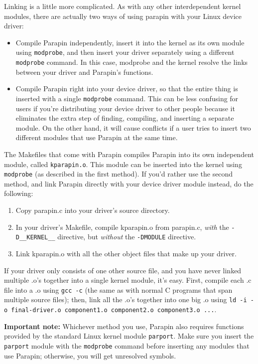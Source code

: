 \documentclass{article}
\begin{document}
Linking is a little more complicated.  As with any other
interdependent kernel modules, there are actually two ways of using
parapin with your Linux device driver:
\begin{itemize}
\item Compile Parapin independently, insert it into the kernel as its
own module using {\tt modprobe}, and then insert your driver separately
using a different {\tt modprobe} command.  In this case, modprobe and the
kernel resolve the links between your driver and Parapin's functions.
\item Compile Parapin right into your device driver, so that the
entire thing is inserted with a single {\tt modprobe} command.  This can
be less confusing for users if you're distributing your device driver
to other people because it eliminates the extra step of finding,
compiling, and inserting a separate module.  On the other hand, it
will cause conflicts if a user tries to insert two different modules
that use Parapin at the same time.
\end{itemize}

The Makefiles that come with Parapin compiles Parapin into its own
independent module, called {\tt kparapin.o}.  This module can be
inserted into the kernel using {\tt modprobe} (as described in the first
method).  If you'd rather use the second method, and link Parapin
directly with your device driver module instead, do the following:

\begin{enumerate}
\item Copy parapin.c into your driver's source directory.
\item In your driver's Makefile, compile kparapin.o from parapin.c,
{\em with} the \verb|-D__KERNEL__| directive, but {\em without} the
{\tt -DMODULE} directive.
\item Link kparapin.o with all the other object files that make up
your driver.
\end{enumerate}

If your driver only consists of one other source file, and you have
never linked multiple .o's together into a single kernel module, it's
easy.  First, compile each .c file into a .o using {\tt gcc -c} (the
same as with normal C programs that span multiple source files); then,
link all the .o's together into one big .o using {\tt ld -i -o
final-driver.o component1.o component2.o component3.o ...}.

{\bf Important note:} Whichever method you use, Parapin also requires
functions provided by the standard Linux kernel module {\tt parport}.
Make sure you insert the {\tt parport} module with the {\tt modprobe}
command before inserting any
modules that use Parapin; otherwise, you will get unresolved symbols.
\end{document}

